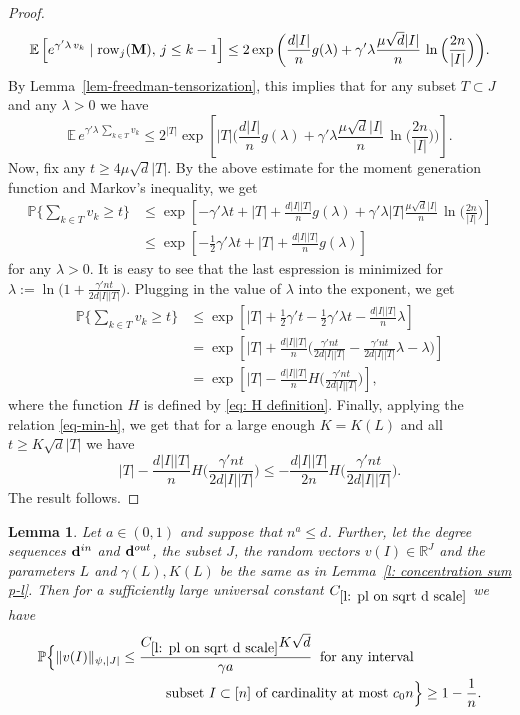 \documentclass[12pt]{article}
\newtheorem{lemma}[theorem]{Lemma}
\theoremstyle{definition}
\theoremstyle{plain}
\newcommand{\E}{\mathbb{E}}
\newcommand{\R}{\mathbb{R}}
\def\ranmtx{{\bf{}M}}
\def\Prob{{\mathbb P}}
\def\InDeg{{\bf d}^{in}}
\def\OutDeg{{\bf d}^{out}}
\def\Row{{\rm row}}
\def\gfunction{{g}}
\begin{document}
\begin{proof}
$$
\E \left[e^{\gamma' \lambda\,v_k}\mid \Row_j(\ranmtx),\,j\leq {k-1}\right]
\leq 2\exp\bigg(\frac{d\vert I\vert}{n}\gfunction(\lambda )+ \gamma'\lambda\frac{\mu\sqrt{d}\vert I\vert}{n}
\, \ln\Big(\frac{2n}{\vert I\vert}\Big)\bigg).
$$
By Lemma~\ref{lem-freedman-tensorization}, this
implies that for any subset $T\subset J$ and any $\lambda>0$ we have
$$
\E \, e^{\gamma' \lambda\,  \sum_{k\in T} v_k}
\leq 2^{|T|}\exp\left[\vert T\vert \bigg(\frac{d\vert I\vert}{n}\gfunction(\lambda )
+ \gamma'\lambda  \frac{\mu\sqrt{d}\vert I\vert}{n}\, \ln\Big(\frac{2n}{\vert I\vert}\Big)\bigg)\right].
$$
Now, fix any $t\geq 4\mu\sqrt{d}|T|$. By the above estimate for the moment generation function and Markov's inequality, we get
\begin{align*}
\Prob\Big\{\sum_{k\in T} v_k \geq t \Big\} 
&\leq \exp\left[-\gamma' \lambda t+ |T|
+\frac{d\vert I\vert|T|}{n}\gfunction(\lambda )
+\gamma'\lambda|T|  \frac{\mu\sqrt{d}\vert I\vert}{n}\, \ln\Big(\frac{2n}{\vert I\vert}\Big)\right]\\
&\leq \exp\left[-\frac{1}{2}\gamma' \lambda t+ |T|
+\frac{d\vert I\vert|T|}{n}\gfunction(\lambda )\right]
\end{align*}
for any $\lambda>0$. It is easy to see that the last espression is minimized for
$\lambda:=\ln\big(1+\frac{\gamma' nt}{2d|I| |T|}\big)$.
Plugging in the value of $\lambda$ into the exponent, we get
\begin{align*}
\Prob\Big\{\sum_{k\in T} v_k \geq t \Big\} 
&\leq\exp\left[|T|+\frac{1}{2}\gamma' t-\frac{1}{2}\gamma'\lambda t-\frac{d|I||T|}{n}\lambda\right]\\
&=\exp\left[|T|+\frac{d|I||T|}{n}\Big(\frac{\gamma' n t}{2d|I||T|}-\frac{\gamma' n t}{2d|I||T|}\lambda-\lambda\Big)\right]\\
&=\exp\left[|T|-\frac{d|I||T|}{n} H\Big(\frac{\gamma' n t}{2d|I||T|}\Big)\right],
\end{align*}
where the function $H$ is defined by \eqref{eq: H definition}.
Finally, applying the relation \eqref{eq-min-h}, we get
that for a large enough $K=K(L)$ and all $t\geq K\sqrt{d}|T|$ we have
$$|T|-\frac{d|I||T|}{n} H\Big(\frac{\gamma' n t}{2d|I||T|}\Big)\leq -\frac{d|I||T|}{2n} H\Big(\frac{\gamma' n t}{2d|I||T|}\Big).$$
The result follows.
\end{proof}



\begin{lemma}\label{l: pl on sqrt d scale}
Let $a\in (0,1)$ and suppose that $n^a\leq d$.
Further, let the degree sequences $\InDeg$ and $\OutDeg$,
the subset $J$, the random vectors $v(I)\in\R^J$ and the parameters $L$ and $\gamma(L),K(L)$
be the same as in Lemma~\ref{l: concentration sum p-l}.
Then for a sufficiently large universal constant $C_{\ref{l: pl on sqrt d scale}}$ we have
\begin{align*}
\Prob\Big\{\Vert v(I)\Vert_{\psi, \vert J\vert} \leq \frac{C_{\ref{l: pl on sqrt d scale}}K\sqrt{d}}{\gamma a}\;\;\mbox{for any interval}&\\
\mbox{subset $I\subset[n]$ of cardinality at most $c_0 n$}&\Big\}\geq 1-\frac{1}{n}.
\end{align*}
\end{lemma}
\end{document}
